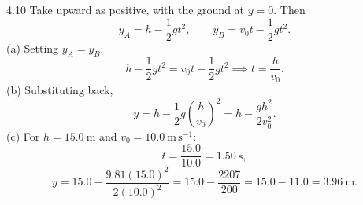 \begin{tabletworkspace}[6.5cm]
\end{tabletworkspace}

\begin{solution}{4.10}
Take upward as positive, with the ground at $y=0$. Then
\[
y_A=h-\frac12gt^2,\qquad
y_B=v_0t-\frac12gt^2.
\]
(a) Setting $y_A=y_B$:
\[
h-\frac12gt^2=v_0t-\frac12gt^2
\implies
t=\frac{h}{v_0}.
\]
(b) Substituting back,
\[
y=h-\frac12g\left(\frac{h}{v_0}\right)^2
=h-\frac{gh^2}{2v_0^2}.
\]
(c) For $h=15.0\ \mathrm{m}$ and $v_0=10.0\ \mathrm{m\,s^{-1}}$:
\[
t=\frac{15.0}{10.0}=1.50\ \mathrm{s},
\]
\[
y=15.0-\frac{9.81(15.0)^2}{2(10.0)^2}
=15.0-\frac{2207}{200}=15.0-11.0=3.96\ \mathrm{m}.
\]
\end{solution}

